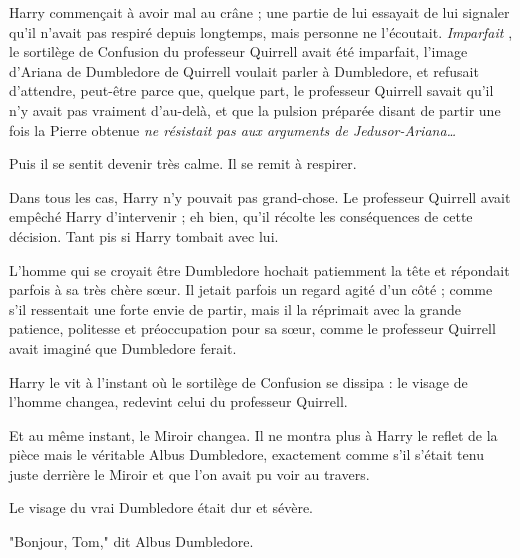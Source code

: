 Harry commençait à avoir mal au crâne ; une partie de lui essayait de lui signaler qu'il n'avait pas respiré depuis longtemps, mais personne ne l'écoutait. \emph{Imparfait} , le sortilège de Confusion du professeur Quirrell avait été imparfait, l'image d'Ariana de Dumbledore de Quirrell voulait parler à Dumbledore, et refusait d'attendre, peut-être parce que, quelque part, le professeur Quirrell savait qu'il n'y avait pas vraiment d'au-delà, et que la pulsion préparée disant de partir une fois la Pierre obtenue \emph{ne résistait pas aux arguments de Jedusor-Ariana…} 

Puis il se sentit devenir très calme. Il se remit à respirer.

Dans tous les cas, Harry n'y pouvait pas grand-chose. Le professeur Quirrell avait empêché Harry d'intervenir ; eh bien, qu'il récolte les conséquences de cette décision. Tant pis si Harry tombait avec lui.

L'homme qui se croyait être Dumbledore hochait patiemment la tête et répondait parfois à sa très chère sœur. Il jetait parfois un regard agité d'un côté ; comme s'il ressentait une forte envie de partir, mais il la réprimait avec la grande patience, politesse et préoccupation pour sa sœur, comme le professeur Quirrell avait imaginé que Dumbledore ferait.

Harry le vit à l'instant où le sortilège de Confusion se dissipa : le visage de l'homme changea, redevint celui du professeur Quirrell.

Et au même instant, le Miroir changea. Il ne montra plus à Harry le reflet de la pièce mais le véritable Albus Dumbledore, exactement comme s'il s'était tenu juste derrière le Miroir et que l'on avait pu voir au travers.

Le visage du vrai Dumbledore était dur et sévère.

"Bonjour, Tom," dit Albus Dumbledore.

